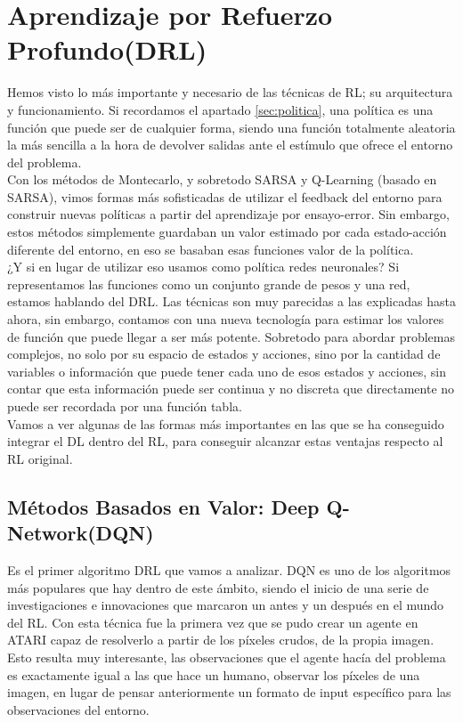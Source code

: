\documentclass[11pt,fleqn]{book} %
\begin{document}
\chapter{Aprendizaje por Refuerzo Profundo(DRL)}

Hemos visto lo más importante y necesario de las técnicas de RL; su arquitectura y funcionamiento. Si recordamos el apartado \ref{sec:politica}, una política es una función que puede ser de cualquier forma, siendo una función totalmente aleatoria la más sencilla a la hora de devolver salidas ante el estímulo que ofrece el entorno del problema. \\

Con los métodos de Montecarlo, y sobretodo SARSA y Q-Learning (basado en SARSA), vimos formas más sofisticadas de utilizar el feedback del entorno para construir nuevas políticas a partir del aprendizaje por ensayo-error. Sin embargo, estos métodos simplemente guardaban un valor estimado por cada estado-acción diferente del entorno, en eso se basaban esas funciones valor de la política. \\

¿Y si en lugar de utilizar eso usamos como política redes neuronales? Si representamos las funciones como un conjunto grande de pesos y una red, estamos hablando del DRL. Las técnicas son muy parecidas a las explicadas hasta ahora, sin embargo, contamos con una nueva tecnología para estimar los valores de función que puede llegar a ser más potente. Sobretodo para abordar problemas complejos, no solo por su espacio de estados y acciones, sino por la cantidad de variables o información que puede tener cada uno de esos estados y acciones, sin contar que esta información puede ser continua y no discreta que directamente no puede ser recordada por una función tabla. \\

Vamos a ver algunas de las formas más importantes en las que se ha conseguido integrar el DL dentro del RL, para conseguir alcanzar estas ventajas respecto al RL original.

\section{Métodos Basados en Valor: Deep Q-Network(DQN)}\label{sec:DQN}

Es el primer algoritmo DRL que vamos a analizar. DQN es uno de los algoritmos más populares que hay dentro de este ámbito, siendo el inicio de una serie de investigaciones e innovaciones que marcaron un antes y un después en el mundo del RL. Con esta técnica fue la primera vez que se pudo crear un agente en ATARI capaz de resolverlo a partir de los píxeles crudos, de la propia imagen. Esto resulta muy interesante, las observaciones que el agente hacía del problema es exactamente igual a las que hace un humano, observar los píxeles de una imagen, en lugar de pensar anteriormente un formato de input específico para las observaciones del entorno. \\
\end{document}
